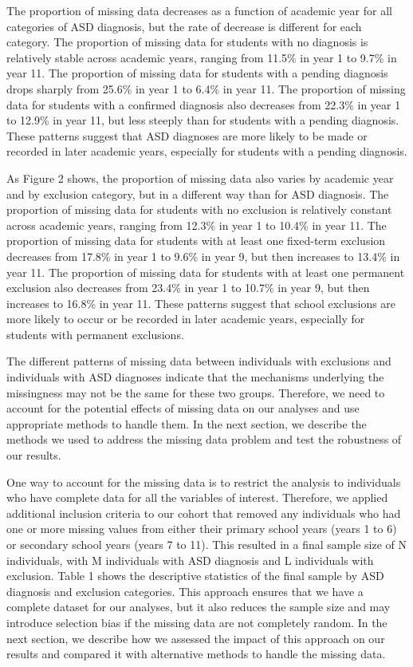 \documentclass[
]{article}
\begin{document}
The proportion of missing data decreases as a function of academic year
for all categories of ASD diagnosis, but the rate of decrease is
different for each category. The proportion of missing data for students
with no diagnosis is relatively stable across academic years, ranging
from 11.5\% in year 1 to 9.7\% in year 11. The proportion of missing
data for students with a pending diagnosis drops sharply from 25.6\% in
year 1 to 6.4\% in year 11. The proportion of missing data for students
with a confirmed diagnosis also decreases from 22.3\% in year 1 to
12.9\% in year 11, but less steeply than for students with a pending
diagnosis. These patterns suggest that ASD diagnoses are more likely to
be made or recorded in later academic years, especially for students
with a pending diagnosis.

As Figure 2 shows, the proportion of missing data also varies by
academic year and by exclusion category, but in a different way than for
ASD diagnosis. The proportion of missing data for students with no
exclusion is relatively constant across academic years, ranging from
12.3\% in year 1 to 10.4\% in year 11. The proportion of missing data
for students with at least one fixed-term exclusion decreases from
17.8\% in year 1 to 9.6\% in year 9, but then increases to 13.4\% in
year 11. The proportion of missing data for students with at least one
permanent exclusion also decreases from 23.4\% in year 1 to 10.7\% in
year 9, but then increases to 16.8\% in year 11. These patterns suggest
that school exclusions are more likely to occur or be recorded in later
academic years, especially for students with permanent exclusions.

The different patterns of missing data between individuals with
exclusions and individuals with ASD diagnoses indicate that the
mechanisms underlying the missingness may not be the same for these two
groups. Therefore, we need to account for the potential effects of
missing data on our analyses and use appropriate methods to handle them.
In the next section, we describe the methods we used to address the
missing data problem and test the robustness of our results.

One way to account for the missing data is to restrict the analysis to
individuals who have complete data for all the variables of interest.
Therefore, we applied additional inclusion criteria to our cohort that
removed any individuals who had one or more missing values from either
their primary school years (years 1 to 6) or secondary school years
(years 7 to 11). This resulted in a final sample size of N individuals,
with M individuals with ASD diagnosis and L individuals with exclusion.
Table 1 shows the descriptive statistics of the final sample by ASD
diagnosis and exclusion categories. This approach ensures that we have a
complete dataset for our analyses, but it also reduces the sample size
and may introduce selection bias if the missing data are not completely
random. In the next section, we describe how we assessed the impact of
this approach on our results and compared it with alternative methods to
handle the missing data.
\end{document}
